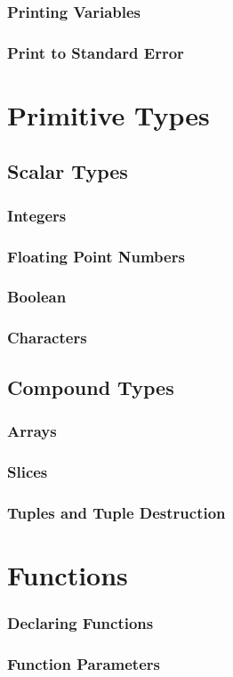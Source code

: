 \documentclass{beamer}
\begin{document}
\begin{frame}
  \frametitle{Printing Variables}
\end{frame}

\begin{frame}
  \frametitle{Print to Standard Error}
\end{frame}

\section{Primitive Types}
\subsection{Scalar Types}
\begin{frame}
  \frametitle{Integers}
\end{frame}

\begin{frame}
  \frametitle{Floating Point Numbers}
\end{frame}

\begin{frame}
  \frametitle{Boolean}
\end{frame}

\begin{frame}
  \frametitle{Characters}
\end{frame}

\subsection{Compound Types}
\begin{frame}
  \frametitle{Arrays}
\end{frame}

\begin{frame}
  \frametitle{Slices}
\end{frame}

\begin{frame}
  \frametitle{Tuples and Tuple Destruction}
\end{frame}

\section{Functions}
\begin{frame}
  \frametitle{Declaring Functions}
\end{frame}

\begin{frame}
  \frametitle{Function Parameters}
\end{frame}
\end{document}
